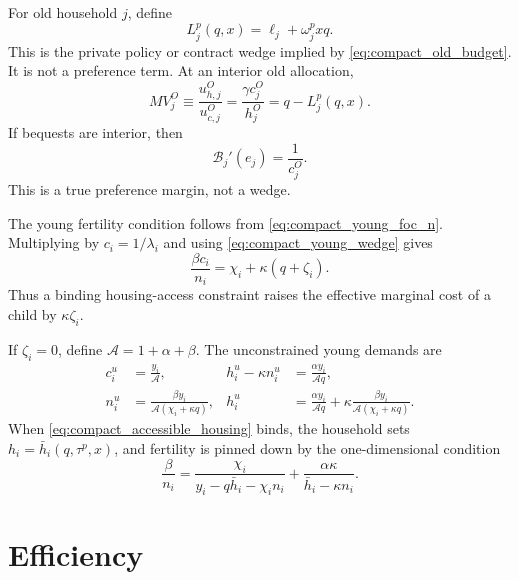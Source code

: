 \documentclass[11pt]{article}
\newcommand{\1}{\mathbf 1}
\begin{document}
For old household $j$, define
\begin{equation}
L_j^p(q,x)=\ell_j+\omega_j^p xq.
\label{eq:compact_Lp}
\end{equation}
This is the private policy or contract wedge implied by \eqref{eq:compact_old_budget}. It is not a preference term. At an interior old allocation,
\begin{equation}
MV_j^O
\equiv
\frac{u^O_{h,j}}{u^O_{c,j}}
=
\frac{\gamma c_j^O}{h_j^O}
=
q-L_j^p(q,x).
\label{eq:compact_old_wedge}
\end{equation}
If bequests are interior, then
\begin{equation}
\mathcal B_j'(e_j)=\frac{1}{c_j^O}.
\label{eq:compact_old_bequest_foc}
\end{equation}
This is a true preference margin, not a wedge.

The young fertility condition follows from \eqref{eq:compact_young_foc_n}. Multiplying by $c_i=1/\lambda_i$ and using \eqref{eq:compact_young_wedge} gives
\begin{equation}
\frac{\beta c_i}{n_i}
=
\chi_i+\kappa(q+\zeta_i).
\label{eq:compact_fertility_wedge}
\end{equation}
Thus a binding housing-access constraint raises the effective marginal cost of a child by $\kappa\zeta_i$.

If $\zeta_i=0$, define $\mathcal A=1+\alpha+\beta$. The unconstrained young demands are
\begin{align}
c_i^u&=\frac{y_i}{\mathcal A},
&
h_i^u-\kappa n_i^u&=\frac{\alpha y_i}{\mathcal A q},
\label{eq:compact_unconstrained_c_s}\\
n_i^u&=\frac{\beta y_i}{\mathcal A(\chi_i+\kappa q)},
&
h_i^u&=
\frac{\alpha y_i}{\mathcal A q}
+
\kappa
\frac{\beta y_i}{\mathcal A(\chi_i+\kappa q)}.
\label{eq:compact_unconstrained_n_h}
\end{align}
When \eqref{eq:compact_accessible_housing} binds, the household sets $h_i=\bar h_i(q,\tau^p,x)$, and fertility is pinned down by the one-dimensional condition
\begin{equation}
\frac{\beta}{n_i}
=
\frac{\chi_i}{y_i-q\bar h_i-\chi_i n_i}
+
\frac{\alpha\kappa}{\bar h_i-\kappa n_i}.
\label{eq:compact_constrained_fertility}
\end{equation}

\section{Efficiency}
\end{document}
